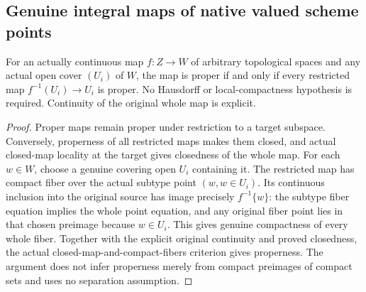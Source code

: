 \subsection{Genuine integral maps of native valued scheme points}
\label{subsec:native-integral-maps}

\begin{theorem}
\label{topology:proper-map-locality}
\leanok
For an actually continuous map $f:Z\to W$ of arbitrary topological
spaces and any actual open cover $(U_i)$ of $W$, the map is proper if
and only if every restricted map $f^{-1}(U_i)\to U_i$ is proper.
No Hausdorff or local-compactness hypothesis is required.
Continuity of the original whole map is explicit.
\end{theorem}
\begin{proof}
Proper maps remain proper under restriction to a target subspace.
Conversely, properness of all restricted maps makes them closed, and
actual closed-map locality at the target gives closedness of the whole
map. For each $w\in W$, choose a genuine covering open $U_i$ containing
it. The restricted map has compact fiber over the actual subtype point
$(w,w\in U_i)$. Its continuous inclusion into the original source has
image precisely $f^{-1}\{w\}$: the subtype fiber equation implies the
whole point equation, and any original fiber point lies in that chosen
preimage because $w\in U_i$. This gives genuine compactness of every
whole fiber. Together with the explicit original continuity and proved
closedness, the actual closed-map-and-compact-fibers criterion gives
properness. The argument does not infer properness merely from compact
preimages of compact sets and uses no separation assumption.
\end{proof}

